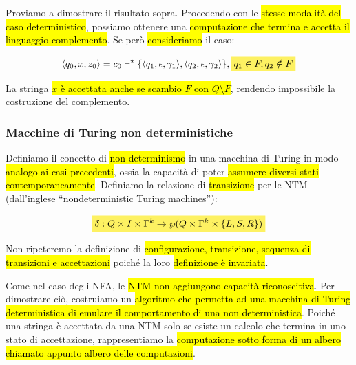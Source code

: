 \documentclass[a4paper,11pt,oneside]{article}
\theoremstyle{plain}
\theoremstyle{definition}
\theoremstyle{remark}
\newcommand{\mhl}[1]{\colorbox{hlcolor}{$\displaystyle #1$}}
\begin{document}
Proviamo a dimostrare il risultato sopra. Procedendo con le \hl{stesse modalità
del caso deterministico}, possiamo ottenere una \hl{computazione che termina e
accetta il linguaggio complemento}. Se però \hl{consideriamo} il caso:

\[
  \langle q_0, x, z_0 \rangle = c_0 \vdash^\star \{
    \langle q_1, \epsilon, \gamma_1 \rangle,
    \langle q_2, \epsilon, \gamma_2 \rangle \}, \mhl{ q_1 \in F, q_2 \notin F }
\]

La stringa \hl{$x$ è accettata anche se scambio $F$ con $Q \setminus F$},
rendendo impossibile la costruzione del complemento.

\subsubsection{Macchine di Turing non deterministiche}\label{sec:ntm}

Definiamo il concetto di \hl{non determinismo} in una macchina di Turing in modo
\hl{analogo ai casi precedenti}, ossia la capacità di poter \hl{assumere diversi
stati contemporaneamente}. Definiamo la relazione di \hl{transizione} per le NTM
(dall'inglese ``nondeterministic Turing machines''):

\begin{equation}
  \mhl{
    \delta : Q \times I \times \Gamma^k \to
      \wp(Q \times \Gamma^k \times \{ L,S,R \})
  }
\end{equation}

Non ripeteremo la definizione di \hl{configurazione, transizione, sequenza di
transizioni e accettazioni} poiché la loro \hl{definizione è invariata}.

Come nel caso degli NFA, le \hl{NTM non aggiungono capacità riconoscitiva}. Per
dimostrare ciò, costruiamo un \hl{algoritmo che permetta ad una macchina di
Turing deterministica di emulare il comportamento di una non deterministica}.
Poiché una stringa è accettata da una NTM solo se esiste un calcolo che termina
in uno stato di accettazione, rappresentiamo la \hl{computazione sotto forma di
un albero chiamato appunto albero delle computazioni}.
\end{document}

